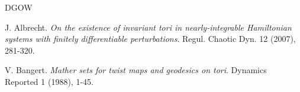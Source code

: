 \documentclass{amsart}
\newcounter{item}[section]
\theoremstyle{definition}
\begin{document}
\begin{thebibliography}{DGOW}
\renewcommand{\baselinestretch}{1.0}
\setlength\itemsep{-1pt}
\small

 J. Albrecht. {\it On the existence of invariant tori in nearly-integrable Hamiltonian systems with finitely
				differentiable perturbations}. Regul. Chaotic Dyn.
			{12} (2007), 281-320.
			
			 V. Bangert. {\it Mather sets for twist maps and geodesics on
				tori}. Dynamics Reported {1} (1988), 1-45.
			
			
			
			
			
			

\end{thebibliography}
\end{document}
